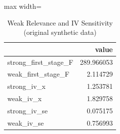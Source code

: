 \begin{table}[htbp]
\centering
\caption{Weak Relevance and IV Sensitivity (original synthetic data)}
\begingroup
\small
\setlength{\tabcolsep}{6pt}
\renewcommand{\arraystretch}{1.12}
\begin{adjustbox}{max width=\linewidth}
\begin{tabular}{@{}lr@{}}
\toprule
 & value \\
\midrule
strong\_first\_stage\_F & 289.966053 \\
weak\_first\_stage\_F & 2.114729 \\
strong\_iv\_x & 1.253781 \\
weak\_iv\_x & 1.829758 \\
strong\_iv\_se & 0.075175 \\
weak\_iv\_se & 0.756993 \\
\bottomrule
\end{tabular}
\end{adjustbox}
\endgroup
\end{table}
